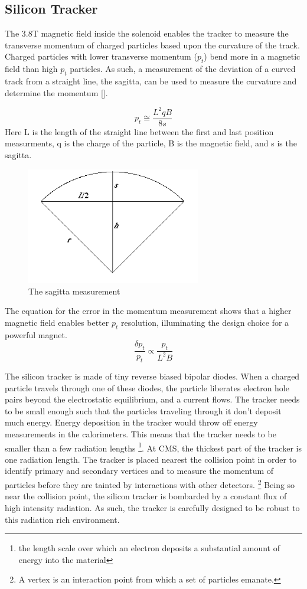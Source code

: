 \subsection{Silicon Tracker}
The 3.8T magnetic field inside the solenoid enables the tracker to measure the transverse momentum of charged particles based upon the curvature of the track. Charged particles with lower transverse momentum ($p_{t}$) bend more in a magnetic field than high $p_{t}$ particles. As such, a measurement of the deviation of a curved track from a straight line, the sagitta, can be used to measure the curvature and determine the momentum [\cite{pdgreview}].

\begin{equation}
p_{t} \cong \frac{L^{2}qB}{8s}
\end{equation}
Here L is the length of the straight line between the first and last position measurments, q is the charge of the particle, B is the magnetic field, and s is the sagitta.
\begin{figure}[h!]
  \centering
  \includegraphics[width=3in]{images/sagitta.png}
  \caption
   {The sagitta measurement}
  \label{fig:sagittadrawing}
\end{figure}
The equation for the error in the momentum measurement shows that a higher magnetic field enables better $p_{t}$ resolution, illuminating the design choice for a powerful magnet.
\begin{equation}
\frac{\delta p_{t}}{p_{t}} \propto \frac{p_{t}}{L^{2}B} 
\end{equation}

The silicon tracker is made of tiny reverse biased bipolar diodes. When a charged particle travels through one of these diodes, the particle liberates electron hole pairs beyond the electrostatic equilibrium, and a current flows. The tracker needs to be small enough such that the particles traveling through it don't deposit much energy. Energy deposition in the tracker would throw off energy measurements in the calorimeters. This means that the tracker needs to be smaller than a few radiation lengths \footnote{the length scale over which an electron deposits a substantial amount of energy into the material}. At CMS, the thickest part of the tracker is one radiation length. The tracker is placed nearest the collision point in order to identify primary and secondary vertices and to measure the momentum of particles before they are tainted by interactions with other detectors. \footnote{A vertex is an interaction point from which a set of particles emanate.} Being so near the collision point, the silicon tracker is bombarded by a constant flux of high intensity radiation. As such, the tracker is carefully designed to be robust to this radiation rich environment.

